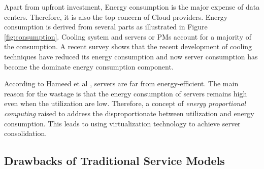 Apart from upfront investment, Energy consumption \cite{Kaplan:up01fR-k} is the major expense of data centers. Therefore, it is also the top concern of Cloud providers. Energy consumption is derived from several parts as illustrated in Figure \ref{fig:consumption}. Cooling system and servers or PMs account for a majority of the consumption. A recent survey \cite{Cho:2016kz} shows that the recent development of cooling techniques have reduced its energy consumption and now server consumption has become the dominate energy consumption component. 

According to Hameed et al \cite{Hameed:2016cmb}, 
servers are far from energy-efficient. 
The main reason for the wastage is that the energy consumption of servers remains high even when the utilization are low. Therefore, a concept of
\emph{energy proportional computing} \cite{Barroso:2007jt} raised to address the disproportionate between utilization and energy consumption. This leads to 
using virtualization technology to achieve server consolidation.


\subsection{Drawbacks of Traditional Service Models}

